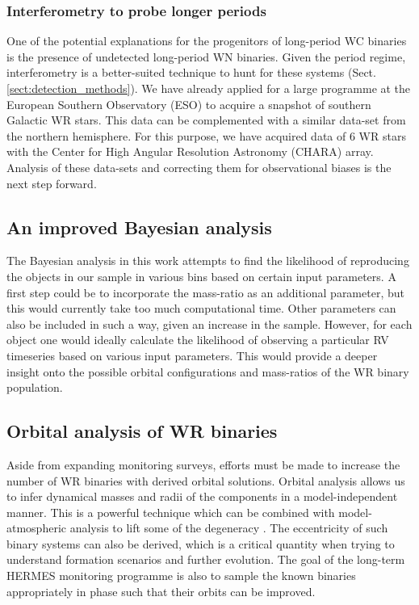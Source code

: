 \subsubsection{Interferometry to probe longer periods}

One of the potential explanations for the progenitors of long-period WC binaries is the presence of undetected long-period WN binaries. Given the period regime, interferometry is a better-suited technique to hunt for these systems (Sect. \ref{sect:detection_methods}). We have already applied for a large programme at the European Southern Observatory (ESO) to acquire a snapshot of southern Galactic WR stars. This data can be complemented with a similar data-set from the northern hemisphere. For this purpose, we have acquired data of 6 WR stars with the Center for High Angular Resolution Astronomy (CHARA) array. Analysis of these data-sets and correcting them for observational biases is the next step forward.

\subsection{An improved Bayesian analysis}

The Bayesian analysis in this work attempts to find the likelihood of reproducing the objects in our sample in various \DelRV{} bins based on certain input parameters. A first step could be to incorporate the mass-ratio as an additional parameter, but this would currently take too much computational time. Other parameters can also be included in such a way, given an increase in the sample. However, for each object one would ideally calculate the likelihood of observing a particular RV timeseries based on various input parameters. This would provide a deeper insight onto the possible orbital configurations and mass-ratios of the WR binary population. 

\subsection{Orbital analysis of WR binaries}

Aside from expanding monitoring surveys, efforts must be made to increase the number of WR binaries with derived orbital solutions. Orbital analysis allows us to infer dynamical masses and radii of the components in a model-independent manner. This is a powerful technique which can be combined with model-atmospheric analysis to lift some of the degeneracy \citep[e.g. in][]{richardson_chara_2016,2021Richardson}. The eccentricity of such binary systems can also be derived, which is a critical quantity when trying to understand formation scenarios and further evolution. The goal of the long-term HERMES monitoring programme is also to sample the known binaries appropriately in phase such that their orbits can be improved. 

